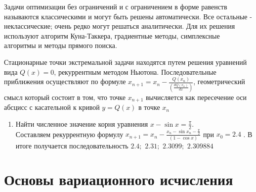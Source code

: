 \documentclass[preprint,russian,a5paper,10pt,twoside]{ncc}
\begin{document}
%
\par Задачи оптимизации без ограничений и с ограничением в форме равенств называются классическими и могут быть решены автоматически. Все остальные - неклассические; очень редко могут решаться аналитически. Для их решения используют алгоритм Куна-Таккера, градиентные методы, симплексные алгоритмы и методы прямого поиска.
\par Стационарные точки экстремальной задачи находятся путем решения уравнений вида $Q\left( x \right)=0$, рекуррентным методом Ньютона. Последовательные приближения осуществляют по формуле ${{x}_{n+1}}={{x}_{n}}-\frac{Q\left( {{x}_{n}} \right)}{\left( \frac{dQ\left( {{x}_{n}} \right)}{dx} \right)}$, геометрический смысл который состоит в том, что точке ${{x}_{n+1}}$ вычисляется как пересечение оси абсцисс с касательной к кривой $y=Q\left( x \right)$ в точке ${{x}_{n}}$ 
\begin{enumerate}[resume]
\item Найти численное значение корня уравнения $x-\sin x=\frac{\pi }{2}$.
\\Составляем рекуррентную формулу ${{x}_{n+1}}={{x}_{n}}-\frac{{{x}_{n}}-\sin {{x}_{n}}-\frac{\pi }{2}}{\left( 1-\cos x \right)}$ при ${{x}_{0}}=2.4$ . В итоге получается последовательность $2.4;$ $2.31;$ $2.3099;$ $2.309884$ 
\end{enumerate}


\clearpage
\section{Основы вариационного исчисления\label{variations}}
\end{document}
